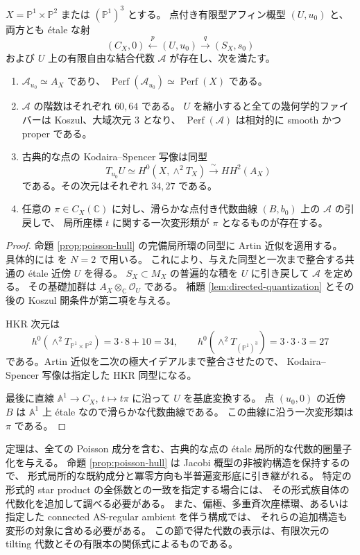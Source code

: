 \begin{theorem}\label{thm:algebraic-quantization-all}
$X=\mathbb P^1\times\mathbb P^2$ または $(\mathbb P^1)^3$ とする。
点付き有限型アフィン概型 $(U,u_0)$ と、両方とも \'etale な射
\[
 (C_X,0)\xleftarrow{\ p\ }(U,u_0)
 \xrightarrow{\ q\ }(S_X,s_0)
\]
および $U$ 上の有限自由な結合代数 $\mathcal A$ が存在し、次を満たす。
\begin{enumerate}
 \item $\mathcal A_{u_0}\simeq A_X$ であり、
 $\operatorname{Perf}(\mathcal A_{u_0})\simeq\operatorname{Perf}(X)$ である。
 \item $\mathcal A$ の階数はそれぞれ $60,64$ である。
 $U$ を縮小すると全ての幾何学的ファイバーは Koszul、大域次元 $3$ となり、
 $\operatorname{Perf}(\mathcal A)$ は相対的に smooth かつ proper である。
 \item 古典的な点の Kodaira--Spencer 写像は同型
 \[
 T_{u_0}U\simeq H^0(X,\wedge^2T_X)
       \xrightarrow{\ \sim\ }HH^2(A_X)
 \]
 である。その次元はそれぞれ $34,27$ である。
 \item 任意の $\pi\in C_X(\mathbb C)$ に対し、滑らかな点付き代数曲線
 $(B,b_0)$ 上の $\mathcal A$ の引戻しで、
 局所座標 $t$ に関する一次変形類が $\pi$ となるものが存在する。
\end{enumerate}
\end{theorem}

\begin{proof}
命題 \ref{prop:poisson-hull} の完備局所環の同型に Artin 近似を適用する。
具体的には \cite[補題37.39.2、Tag 0CAT]{StacksArtin} を $N=2$ で用いる。
これにより、与えた同型と一次まで整合する共通の \'etale 近傍 $U$ を得る。
$S_X\subset M_X$ の普遍的な積を $U$ に引き戻して $\mathcal A$ を定める。
その基礎加群は $A_X\otimes_{\mathbb C}\mathcal O_U$ である。
補題 \ref{lem:directed-quantization} とその後の Koszul 開条件が第二項を与える。

HKR 次元は
\[
 h^0(\wedge^2T_{\mathbb P^1\times\mathbb P^2})
 =3\cdot8+10=34,\qquad
 h^0(\wedge^2T_{(\mathbb P^1)^3})=3\cdot3\cdot3=27
\]
である。Artin 近似を二次の極大イデアルまで整合させたので、
Kodaira--Spencer 写像は指定した HKR 同型になる。

最後に直線 $\mathbb A^1\to C_X$, $t\mapsto t\pi$ に沿って $U$ を基底変換する。
点 $(u_0,0)$ の近傍 $B$ は $\mathbb A^1$ 上 \'etale なので滑らかな代数曲線である。
この曲線に沿う一次変形類は $\pi$ である。
\end{proof}

\begin{remark}\label{rem:quantization-scope}
定理は、全ての Poisson 成分を含む、古典的な点の \'etale 局所的な代数的圏量子化を与える。
命題 \ref{prop:poisson-hull} は Jacobi 概型の非被約構造を保持するので、
形式局所的な既約成分と冪零方向も半普遍変形底に引き継がれる。
特定の形式的 star product の全係数との一致を指定する場合には、
その形式族自体の代数化を追加して調べる必要がある。
また、偏極、多重斉次座標環、あるいは指定した connected AS-regular ambient を伴う構成では、
それらの追加構造も変形の対象に含める必要がある。
この節で得た代数の表示は、有限次元の tilting 代数とその有限本の関係式によるものである。
\end{remark}
